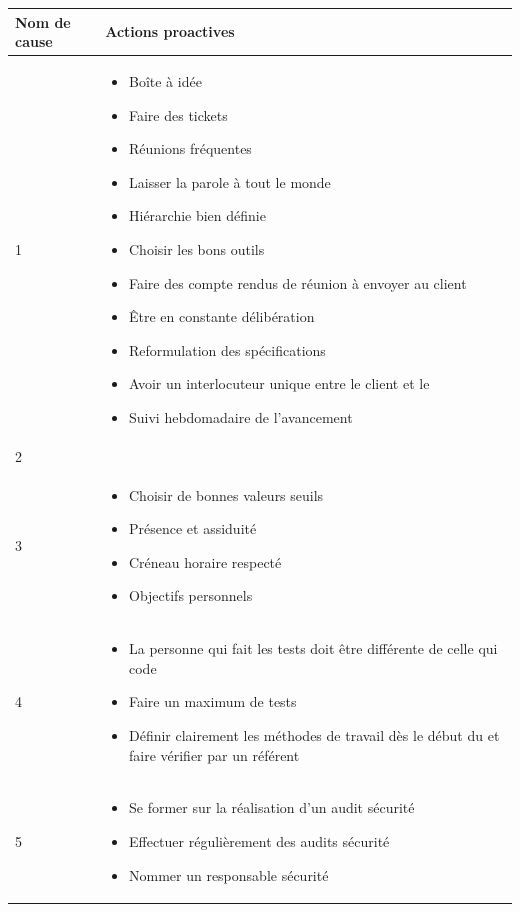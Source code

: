 \centering
	\begin{longtable}{|p{7cm}|p{7cm}|}
	\hline
	\rowcolor{gray!40} Nom de cause & Actions proactives \\
	\hline
	 1 & \begin{itemize}
	 	\item Boîte à idée
	 	\item Faire des tickets
	 	\item Réunions fréquentes
	 	\item Laisser la parole à tout le monde
	 	\item Hiérarchie bien définie
	 	\item Choisir les bons outils
	 	\item Faire des compte rendus de réunion à envoyer au client
	 	\item Être en constante délibération
	 	\item Reformulation des spécifications
	 	\item Avoir un interlocuteur unique entre le client et le \PICCourt
	 	\item Suivi hebdomadaire de l'avancement
	 \end{itemize} \\
	\hline
	2 & \\
	\hline
	3 & \begin{itemize}
		\item Choisir de bonnes valeurs seuils
		\item Présence et assiduité
		\item Créneau horaire respecté
		\item Objectifs personnels
	\end{itemize} \\
	\hline
	4 & \begin{itemize}
		\item La personne qui fait les tests doit être différente de celle qui code
		\item Faire un maximum de tests
		\item Définir clairement les méthodes de travail dès le début du \PICCourt et faire vérifier par un référent
	\end{itemize} \\
	\hline
	5 & \begin{itemize}
		\item Se former sur la réalisation d'un audit sécurité
		\item Effectuer régulièrement des audits sécurité
		\item Nommer un responsable sécurité

\end{itemize}
\end{longtable}
